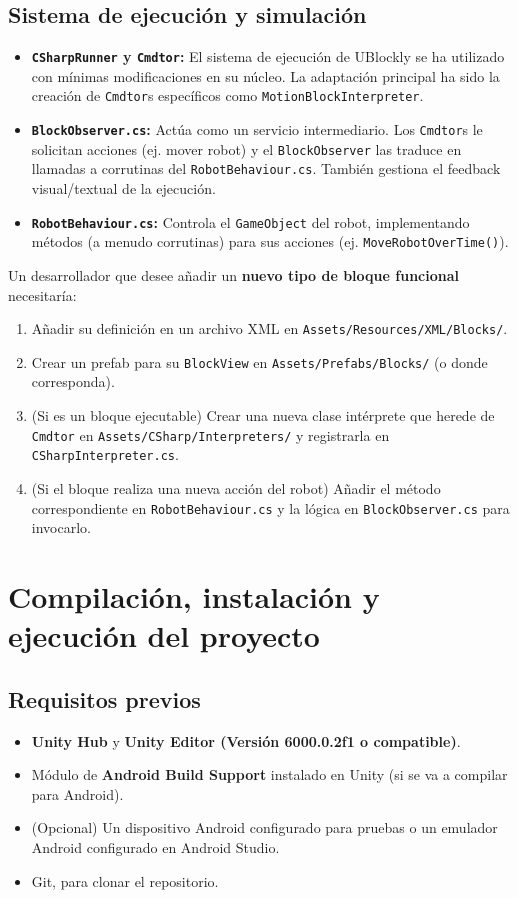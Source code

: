 \subsection{Sistema de ejecución y simulación}
\begin{itemize}
	\item \textbf{\texttt{CSharpRunner} y \texttt{Cmdtor}:} El sistema de ejecución de UBlockly se ha utilizado con mínimas modificaciones en su núcleo. La adaptación principal ha sido la creación de \texttt{Cmdtor}s específicos como \texttt{MotionBlockInterpreter}.
	\item \textbf{\texttt{BlockObserver.cs}:} Actúa como un servicio intermediario. Los \texttt{Cmdtor}s le solicitan acciones (ej. mover robot) y el \texttt{BlockObserver} las traduce en llamadas a corrutinas del \texttt{RobotBehaviour.cs}. También gestiona el feedback visual/textual de la ejecución.
	\item \textbf{\texttt{RobotBehaviour.cs}:} Controla el \texttt{GameObject} del robot, implementando métodos (a menudo corrutinas) para sus acciones (ej. \texttt{MoveRobotOverTime()}).
\end{itemize}
Un desarrollador que desee añadir un \textbf{nuevo tipo de bloque funcional} necesitaría:
\begin{enumerate}
	\item Añadir su definición en un archivo XML en \texttt{Assets/Resources/XML/Blocks/}.
	\item Crear un prefab para su \texttt{BlockView} en \texttt{Assets/Prefabs/Blocks/} (o donde corresponda).
	\item (Si es un bloque ejecutable) Crear una nueva clase intérprete que herede de \texttt{Cmdtor} en \texttt{Assets/CSharp/Interpreters/} y registrarla en \texttt{CSharpInterpreter.cs}.
	\item (Si el bloque realiza una nueva acción del robot) Añadir el método correspondiente en \texttt{RobotBehaviour.cs} y la lógica en \texttt{BlockObserver.cs} para invocarlo.
\end{enumerate}

\section{Compilación, instalación y ejecución del proyecto}

\subsection{Requisitos previos}
\begin{itemize}
	\item \textbf{Unity Hub} y \textbf{Unity Editor (Versión 6000.0.2f1 o compatible)}.
	\item Módulo de \textbf{Android Build Support} instalado en Unity (si se va a compilar para Android).
	\item (Opcional) Un dispositivo Android configurado para pruebas o un emulador Android configurado en Android Studio.
	\item Git, para clonar el repositorio.
\end{itemize}

